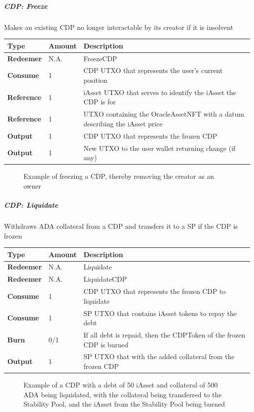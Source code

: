 \documentclass{article}
\begin{document}
\begin{sloppypar}
\hypertarget{cdp-freeze}{%
\subparagraph{CDP: Freeze}\label{cdp-freeze}}

Makes an existing CDP no longer interactable by its creator if it is
insolvent

\begin{tabularx}{\linewidth}{l|l|L}
\toprule
\textbf{Type} & \textbf{Amount} & \textbf{Description}
\tabularnewline
\midrule
\endhead
\textbf{Redeemer} & N.A. & FreezeCDP
\tabularnewline
\midrule
\textbf{Consume} & 1 & CDP UTXO that represents the user's current
position
\tabularnewline
\midrule
\textbf{Reference} & 1 & iAsset UTXO that serves to identify the iAsset
the CDP is for
\tabularnewline
\midrule
\textbf{Reference} & 1 & UTXO containing the OracleAssetNFT with a datum
describing the iAsset price
\tabularnewline
\midrule
\textbf{Output} & 1 & CDP UTXO that represents the frozen
CDP
\tabularnewline
\midrule
\textbf{Output} & 1 & New UTXO to the user wallet returning change (if
any)
\tabularnewline
\bottomrule
\end{tabularx}

\hypertarget{cdp-freeze-figure}{%
\begin{figure}[htbp]
\centering

\caption{Example of freezing a CDP, thereby removing the creator as
an owner}
\label{cdp-freeze-figure}
\end{figure}}

\hypertarget{cdp-liquidate}{%
\subparagraph{CDP: Liquidate}\label{cdp-liquidate}}

Withdraws ADA collateral from a CDP and transfers it to a SP if the CDP
is frozen

\begin{tabularx}{\linewidth}{l|l|L}
\toprule
\textbf{Type} & \textbf{Amount} & \textbf{Description}
\tabularnewline
\midrule
\endhead
\textbf{Redeemer} & N.A. & Liquidate
\tabularnewline
\midrule
\textbf{Redeemer} & N.A. & LiquidateCDP
\tabularnewline
\midrule
\textbf{Consume} & 1 & CDP UTXO that represents the frozen CDP to
liquidate
\tabularnewline
\midrule
\textbf{Consume} & 1 & SP UTXO that contains iAsset tokens to repay the
debt
\tabularnewline
\midrule
\textbf{Burn} & 0/1 & If all debt is repaid, then the CDPToken of the
frozen CDP is burned
\tabularnewline
\midrule
\textbf{Output} & 1 & SP UTXO that with the added collateral from the
frozen CDP
\tabularnewline
\bottomrule
\end{tabularx}

\hypertarget{cdp-liquidate-figure}{%
\begin{figure}[htbp]
\centering

\caption{Example of a CDP with a debt of 50 iAsset and collateral
of 500 ADA being liquidated, with the collateral being transferred
to the Stability Pool, and the iAsset from the Stability Pool
being burned}
\label{cdp-liquidate-figure}
\end{figure}}


\end{sloppypar}
\end{document}
